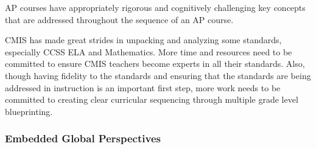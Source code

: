 \begin{findings}
AP courses have appropriately rigorous and cognitively challenging key concepts that are addressed throughout the sequence of an AP course.  


CMIS has made great strides in unpacking and analyzing some standards, especially CCSS ELA  and Mathematics. More time and resources need to be committed to ensure CMIS teachers become experts in all their standards. Also, though having fidelity to the standards and ensuring that the standards are being addressed in instruction is an important first step, more work needs to be committed to creating clear curricular sequencing through multiple grade level blueprinting. 
\end{findings}

\subsubsection{Embedded Global Perspectives}



